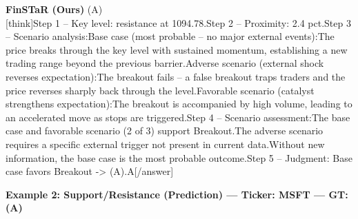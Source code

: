 \begin{minipage}[t]{0.41\textwidth}
\colorbox{green!10}{\parbox{\dimexpr\textwidth-2\fboxsep}{
\textbf{FinSTaR (Ours)} \textcolor{green!50!black}{(A)} \\[2pt]
\tiny
[think]\newline Step 1 -- Key level: resistance at 1094.78.\newline Step 2 -- Proximity: 2.4 pct.\newline Step 3 -- Scenario analysis:\newline   Base case (most probable -- no major external events):\newline     The price breaks through the key level with sustained momentum, establishing a new trading range beyond the previous barrier.\newline   Adverse scenario (external shock reverses expectation):\newline     The breakout fails -- a false breakout traps traders and the price reverses sharply back through the level.\newline   Favorable scenario (catalyst strengthens expectation):\newline     The breakout is accompanied by high volume, leading to an accelerated move as stops are triggered.\newline Step 4 -- Scenario assessment:\newline   The base case and favorable scenario (2 of 3) support Breakout.\newline   The adverse scenario requires a specific external trigger not present in current data.\newline   Without new information, the base case is the most probable outcome.\newline Step 5 -- Judgment: Base case favors Breakout -> (A).\newline [/think]\newline [answer]A[/answer]
}}
\end{minipage}
\vspace{8pt}


\noindent
\textbf{Example 2: Support/Resistance (Prediction) --- Ticker: MSFT --- GT: (A)}
\vspace{2pt}

